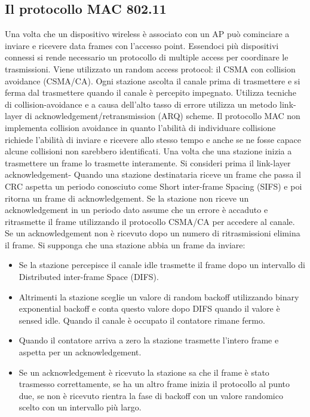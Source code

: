 \subsection{Il protocollo MAC 802.11}
Una volta che un dispositivo wireless \`e associato con un AP pu\`o cominciare a inviare e ricevere data frames con l'accesso point. Essendoci pi\`u dispositivi connessi si rende necessario un protocollo di 
multiple access per coordinare le trasmissioni. Viene utilizzato un random access protocol: il CSMA con collision avoidance (CSMA/CA). Ogni stazione ascolta il canale prima di trasmettere e si ferma dal 
trasmettere quando il canale \`e percepito impegnato. Utilizza tecniche di collision-avoidance e a causa dell'alto tasso di errore utilizza un metodo link-layer di acknowledgement/retransmission (ARQ) scheme.
Il protocollo MAC non implementa collision avoidance in quanto l'abilit\`a di individuare collisione richiede l'abilit\`a di inviare e ricevere allo stesso tempo e anche se ne fosse capace alcune collisioni non 
sarebbero identificati. Una volta che una stazione inizia a trasmettere un frame lo trasmette interamente. Si consideri prima il link-layer acknowledgement- Quando una stazione destinataria riceve un frame che
passa il CRC aspetta un periodo conosciuto come Short inter-frame Spacing (SIFS) e poi  ritorna un frame di acknowledgement. Se la stazione non riceve un acknowledgement in un periodo dato assume che un
errore \`e accaduto e ritrasmette il frame utilizzando il protocollo CSMA/CA per accedere al canale. Se un acknowledgement non \`e ricevuto dopo un numero di ritrasmissioni elimina il frame. Si supponga che
una stazione abbia un frame da inviare:
\begin{itemize}
\item Se la stazione percepisce il canale idle trasmette il frame dopo un intervallo di Distributed inter-frame Space (DIFS).
\item Altrimenti la stazione sceglie un valore di random backoff utilizzando binary exponential backoff e conta questo valore dopo DIFS quando il valore \`e sensed idle. Quando il canale \`e occupato il contatore
rimane fermo.
\item Quando il contatore arriva a zero la stazione trasmette l'intero frame e aspetta per un acknowledgement.
\item Se un acknowledgement \`e ricevuto la stazione sa che il frame \`e stato trasmesso correttamente, se ha un altro frame inizia il protocollo al punto due, se non \`e ricevuto rientra la fase di backoff con un
valore randomico scelto con un intervallo pi\`u largo.
\end{itemize}
